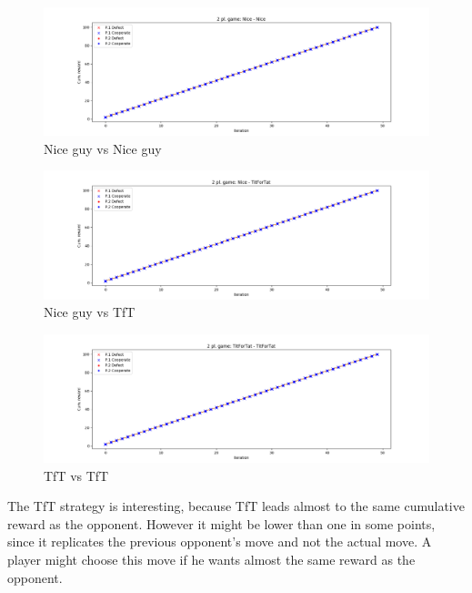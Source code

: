 \documentclass[journal,a4paper,10pt,twoside]{IEEEtran}
\begin{document}
\begin{figure}
    \centering
    \includegraphics[width=1\columnwidth]{img_v1/idp2p-rewards-Nice-Nice.png}
    \caption{Nice guy vs Nice guy}
    \label{fig:nicevsnice}
\end{figure}

\begin{figure}
    \centering
    \includegraphics[width=1\columnwidth]{img_v1/idp2p-rewards-Nice-TitForTat.png}
    \caption{Nice guy vs TfT}
    \label{fig:nicevstft}
\end{figure}

\begin{figure}
    \centering
    \includegraphics[width=1\columnwidth]{img_v1/idp2p-rewards-TitForTat-TitForTat.png}
    \caption{TfT vs TfT}
    \label{fig:tftvstft}
\end{figure}

The TfT strategy is interesting, because TfT leads almost to the same cumulative reward as the opponent. However it might be lower than one in some points, since it replicates the previous opponent's move and not the actual move. A player might choose this move if he wants almost the same reward as the opponent.
\end{document}
